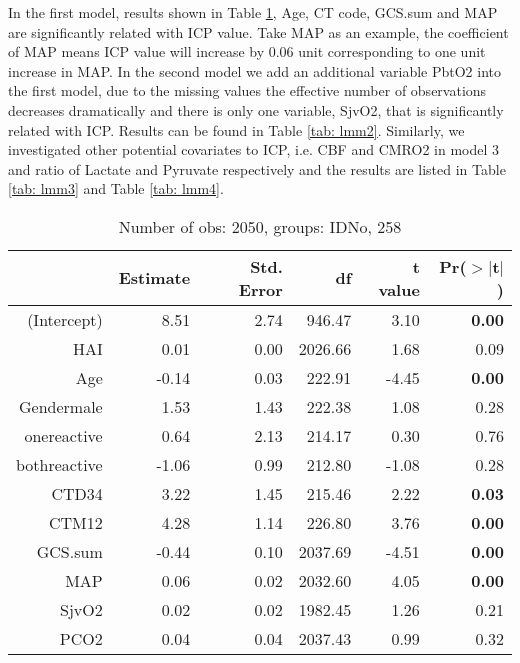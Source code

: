 \documentclass{article}
\begin{document}
In the first model, results shown in Table \ref{tab: lmm1}, Age, CT code, GCS.sum and MAP are significantly related with ICP value. Take MAP as an example, the coefficient of MAP means ICP value will increase by 0.06 unit corresponding to one unit increase in MAP. In the second model we add an additional variable PbtO2 into the first model, due to the missing values the effective number of observations decreases dramatically and there is only one variable, SjvO2, that is significantly related with ICP. Results can be found in Table \ref{tab: lmm2}. Similarly, we investigated other potential covariates to ICP, i.e. CBF and CMRO2 in model 3 and ratio of Lactate and Pyruvate respectively and the results are listed in Table \ref{tab: lmm3} and Table \ref{tab: lmm4}. 

\begin{table}[H]
\centering
\begin{tabular}{rrrrrr}
  \hline
 & Estimate & Std. Error & df & t value & Pr($>$$|$t$|$) \\ 
  \hline
(Intercept) & 8.51 & 2.74 & 946.47 & 3.10 & {\bf 0.00} \\ 
  HAI & 0.01 & 0.00 & 2026.66 & 1.68 & 0.09 \\ 
  Age & -0.14 & 0.03 & 222.91 & -4.45 & {\bf 0.00} \\ 
  Gendermale & 1.53 & 1.43 & 222.38 & 1.08 & 0.28 \\ 
  onereactive & 0.64 & 2.13 & 214.17 & 0.30 & 0.76 \\ 
  bothreactive & -1.06 & 0.99 & 212.80 & -1.08 & 0.28 \\ 
  CTD34 & 3.22 & 1.45 & 215.46 & 2.22 & {\bf 0.03} \\ 
  CTM12 & 4.28 & 1.14 & 226.80 & 3.76 & {\bf 0.00} \\ 
  GCS.sum & -0.44 & 0.10 & 2037.69 & -4.51 & {\bf 0.00} \\ 
  MAP & 0.06 & 0.02 & 2032.60 & 4.05 & {\bf 0.00} \\ 
  SjvO2 & 0.02 & 0.02 & 1982.45 & 1.26 & 0.21 \\ 
  PCO2 & 0.04 & 0.04 & 2037.43 & 0.99 & 0.32 \\ 
   \hline
\end{tabular}
\caption{Number of obs: 2050, groups: IDNo, 258}
\label{tab: lmm1}
\end{table}
\end{document}

